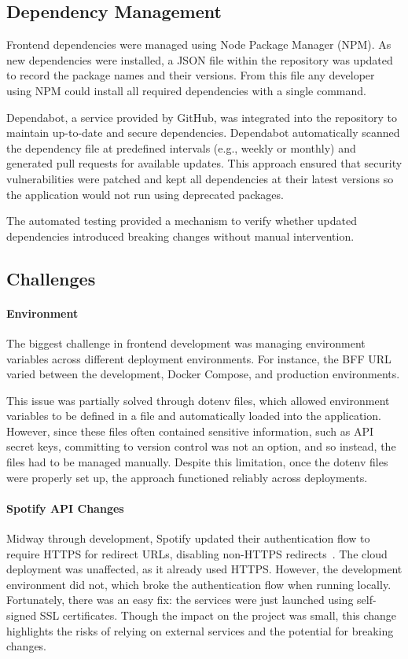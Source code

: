\subsection{Dependency Management}
Frontend dependencies were managed using Node Package Manager (NPM). As new dependencies were installed, a JSON file within the repository was updated to record the package names and their versions. From this file any developer using NPM could install all required dependencies with a single command.

Dependabot, a service provided by GitHub, was integrated into the repository to maintain up-to-date and secure dependencies. Dependabot automatically scanned the dependency file at predefined intervals (e.g., weekly or monthly) and generated pull requests for available updates. This approach ensured that security vulnerabilities were patched and kept all dependencies at their latest versions so the application would not run using deprecated packages.

The automated testing provided a mechanism to verify whether updated dependencies introduced breaking changes without manual intervention.

\subsection{Challenges}
\paragraph{Environment}
The biggest challenge in frontend development was managing environment variables across different deployment environments. For instance, the BFF URL varied between the development, Docker Compose, and production environments.

This issue was partially solved through dotenv files, which allowed environment variables to be defined in a file and automatically loaded into the application. However, since these files often contained sensitive information, such as API secret keys, committing to version control was not an option, and so instead, the files had to be managed manually. Despite this limitation, once the dotenv files were properly set up, the approach functioned reliably across deployments.

\paragraph{Spotify API Changes}
Midway through development, Spotify updated their authentication flow to require HTTPS for redirect URLs, disabling non-HTTPS redirects~\cite{spotifyredirects}. The cloud deployment was unaffected, as it already used HTTPS. However, the development environment did not, which broke the authentication flow when running locally. Fortunately, there was an easy fix: the services were just launched using self-signed SSL certificates. Though the impact on the project was small, this change highlights the risks of relying on external services and the potential for breaking changes.

